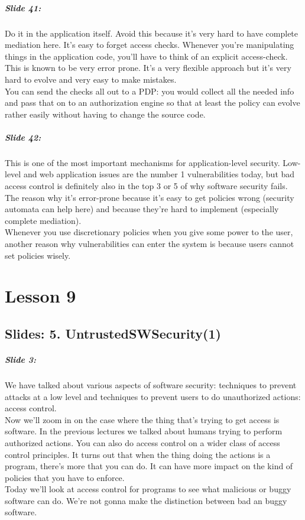 \documentclass[10pt,a4paper]{report}
\begin{document}
\paragraph{Slide 41:} Do it in the application itself. Avoid this because it's very hard to have complete mediation here. It's easy to forget access checks. Whenever you're manipulating things in the application code, you'll have to think of an explicit access-check. This is known to be very error prone. It's a very flexible approach but it's very hard to evolve and very easy to make mistakes. \\
You can send the checks all out to a PDP: you would collect all the needed info and pass that on to an authorization engine so that at least the policy can evolve rather easily without having to change the source code.

\paragraph{Slide 42:} This is one of the most important mechanisms for application-level security. Low-level and web application issues are the number 1 vulnerabilities today, but bad access control is definitely also in the top 3 or 5 of why software security fails. The reason why it's error-prone because it's easy to get policies wrong (security automata can help here) and because they're hard to implement (especially complete mediation).\\
Whenever you use discretionary policies when you give some power to the user, another reason why vulnerabilities can enter the system is because users cannot set policies wisely.

\chapter{Lesson 9}
\section{Slides: 5. UntrustedSWSecurity(1)}

\paragraph{Slide 3:} We have talked about various aspects of software security: techniques to prevent attacks at a low level  and techniques to prevent users to do unauthorized actions: access control.\\
Now we'll zoom in on the case where the thing that's trying to get access is software. In the previous lectures we talked about humans trying to perform authorized actions. You can also do access control on a wider class of access control principles. It turns out that when the thing doing the actions is a program, there's more that you can do. It can have more impact on the kind of policies that you have to enforce.\\
Today we'll look at access control for programs to see what malicious or buggy software can do. We're not gonna make the distinction between bad an buggy software.
\end{document}
